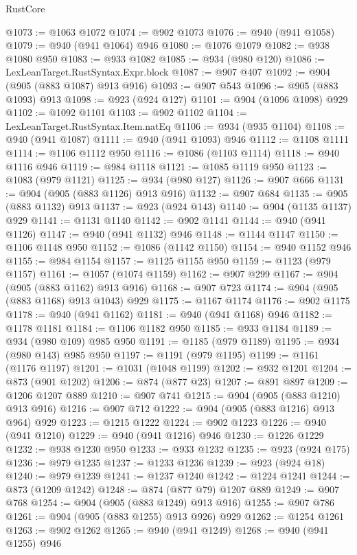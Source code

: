 \begin{lexlean}{RustCore}
\begin{coremodule}
@1073 := @1063 @1072
@1074 := @902 @1073
@1076 := @940 (@941 @1058)
@1079 := @940 (@941 @1064) @946
@1080 := @1076 @1079
@1082 := @938 @1080 @950
@1083 := @933 @1082
@1085 := @934 (@980 @120)
@1086 := LexLeanTarget.RustSyntax.Expr.block
@1087 := @907 @407
@1092 := @904 (@905 (@883 @1087) @913 @916)
@1093 := @907 @543
@1096 := @905 (@883 @1093) @913
@1098 := @923 (@924 @127)
@1101 := @904 (@1096 @1098) @929
@1102 := @1092 @1101
@1103 := @902 @1102
@1104 := LexLeanTarget.RustSyntax.Item.natEq
@1106 := @934 (@935 @1104)
@1108 := @940 (@941 @1087)
@1111 := @940 (@941 @1093) @946
@1112 := @1108 @1111
@1114 := @1106 @1112 @950
@1116 := @1086 (@1103 @1114)
@1118 := @940 @1116 @946
@1119 := @984 @1118
@1121 := @1085 @1119 @950
@1123 := @1083 (@979 @1121)
@1125 := @934 (@980 @127)
@1126 := @907 @666
@1131 := @904 (@905 (@883 @1126) @913 @916)
@1132 := @907 @684
@1135 := @905 (@883 @1132) @913
@1137 := @923 (@924 @143)
@1140 := @904 (@1135 @1137) @929
@1141 := @1131 @1140
@1142 := @902 @1141
@1144 := @940 (@941 @1126)
@1147 := @940 (@941 @1132) @946
@1148 := @1144 @1147
@1150 := @1106 @1148 @950
@1152 := @1086 (@1142 @1150)
@1154 := @940 @1152 @946
@1155 := @984 @1154
@1157 := @1125 @1155 @950
@1159 := @1123 (@979 @1157)
@1161 := @1057 (@1074 @1159)
@1162 := @907 @299
@1167 := @904 (@905 (@883 @1162) @913 @916)
@1168 := @907 @723
@1174 := @904 (@905 (@883 @1168) @913 @1043) @929
@1175 := @1167 @1174
@1176 := @902 @1175
@1178 := @940 (@941 @1162)
@1181 := @940 (@941 @1168) @946
@1182 := @1178 @1181
@1184 := @1106 @1182 @950
@1185 := @933 @1184
@1189 := @934 (@980 @109) @985 @950
@1191 := @1185 (@979 @1189)
@1195 := @934 (@980 @143) @985 @950
@1197 := @1191 (@979 @1195)
@1199 := @1161 (@1176 @1197)
@1201 := @1031 (@1048 @1199)
@1202 := @932 @1201
@1204 := @873 (@901 @1202)
@1206 := @874 (@877 @23)
@1207 := @891 @897
@1209 := @1206 @1207 @889
@1210 := @907 @741
@1215 := @904 (@905 (@883 @1210) @913 @916)
@1216 := @907 @712
@1222 := @904 (@905 (@883 @1216) @913 @964) @929
@1223 := @1215 @1222
@1224 := @902 @1223
@1226 := @940 (@941 @1210)
@1229 := @940 (@941 @1216) @946
@1230 := @1226 @1229
@1232 := @938 @1230 @950
@1233 := @933 @1232
@1235 := @923 (@924 @175)
@1236 := @979 @1235
@1237 := @1233 @1236
@1239 := @923 (@924 @18)
@1240 := @979 @1239
@1241 := @1237 @1240
@1242 := @1224 @1241
@1244 := @873 (@1209 @1242)
@1248 := @874 (@877 @79) @1207 @889
@1249 := @907 @768
@1254 := @904 (@905 (@883 @1249) @913 @916)
@1255 := @907 @786
@1261 := @904 (@905 (@883 @1255) @913 @926) @929
@1262 := @1254 @1261
@1263 := @902 @1262
@1265 := @940 (@941 @1249)
@1268 := @940 (@941 @1255) @946

\end{coremodule}
\end{lexlean}
